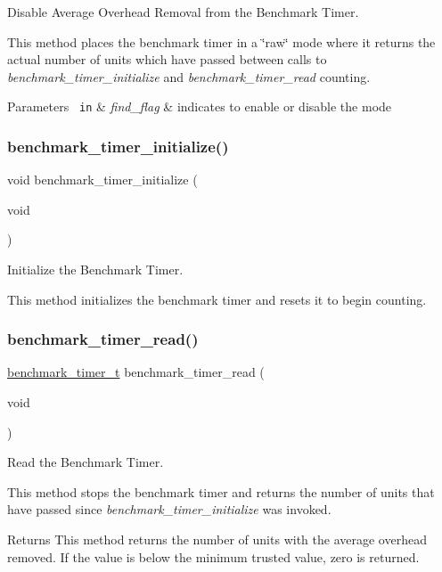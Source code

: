 Disable Average Overhead Removal from the Benchmark Timer. 

This method places the benchmark timer in a \char`\"{}raw\char`\"{} mode where it returns the actual number of units which have passed between calls to {\itshape benchmark\+\_\+timer\+\_\+initialize} and {\itshape benchmark\+\_\+timer\+\_\+read} counting.


\begin{DoxyParams}[1]{Parameters}
\mbox{\texttt{ in}}  & {\em find\+\_\+flag} & indicates to enable or disable the mode \\
\hline
\end{DoxyParams}
\mbox{\label{btimer-ppc-dec_8c_a9ba0ae2fd8880801fb86979a16cd3b2b}} 
\subsubsection{\texorpdfstring{benchmark\_timer\_initialize()}{benchmark\_timer\_initialize()}}
{\footnotesize\ttfamily void benchmark\+\_\+timer\+\_\+initialize (\begin{DoxyParamCaption}\item[{void}]{ }\end{DoxyParamCaption})}



Initialize the Benchmark Timer. 

This method initializes the benchmark timer and resets it to begin counting. \mbox{\label{btimer-ppc-dec_8c_ab8dc8517e97918d293d78e85b9454855}} 
\subsubsection{\texorpdfstring{benchmark\_timer\_read()}{benchmark\_timer\_read()}}
{\footnotesize\ttfamily \mbox{\hyperlink{btimer_8h_ac0f944fe3193b01df09c3d3a5a677e5a}{benchmark\+\_\+timer\+\_\+t}} benchmark\+\_\+timer\+\_\+read (\begin{DoxyParamCaption}\item[{void}]{ }\end{DoxyParamCaption})}



Read the Benchmark Timer. 

This method stops the benchmark timer and returns the number of units that have passed since {\itshape benchmark\+\_\+timer\+\_\+initialize} was invoked.

\begin{DoxyReturn}{Returns}
This method returns the number of units with the average overhead removed. If the value is below the minimum trusted value, zero is returned. 
\end{DoxyReturn}
